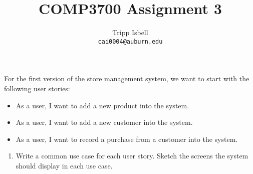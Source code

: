 \documentclass[notitlepage, 11pt]{report}
\title{COMP3700 Assignment 3}
\author{Tripp Isbell\\
	\texttt{cai0004@auburn.edu}}
\date{}
\begin{document}
\maketitle
For the first version of the store management system, we want to start with the following user stories:
\begin{itemize}
	\item As a user, I want to add a new product into the system.
	\item As a user, I want to add a new customer into the system.
	\item As a user, I want to record a purchase from a customer into the system.
\end{itemize}
\begin{enumerate}[itemindent=-1.5em]
	\item Write a common use case for each user story. Sketch the screens the system should display in each use case.
	

\end{enumerate}
\end{document}
